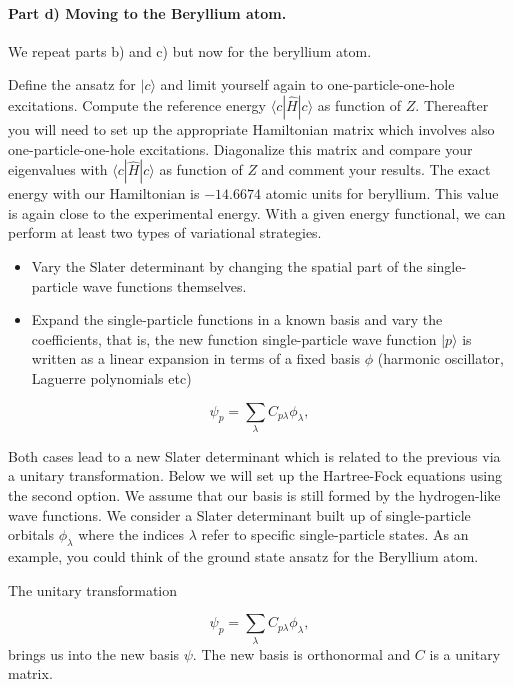 \documentclass[%
oneside,                 %
final,                   %
10pt]{article}
\begin{document}
\paragraph{Part d) Moving to the Beryllium atom.}
We repeat parts b) and c) but now for the beryllium atom.

Define the ansatz for $|c\rangle$ and limit yourself again to one-particle-one-hole excitations.   Compute the reference energy 
$\langle c | \hat{H}| c \rangle $ as function of $Z$. Thereafter you will need to set up the appropriate Hamiltonian matrix
which involves also one-particle-one-hole excitations. Diagonalize this matrix
and compare your eigenvalues with  $\langle c | \hat{H}| c \rangle$ as function of $Z$ and comment your results. 
The exact energy with our Hamiltonian is $-14.6674$ atomic units for beryllium. This value is again close to the experimental energy.
With a given energy functional, we can perform at least two types of variational strategies.

\begin{itemize}
  \item Vary the Slater determinant by changing the spatial part of the single-particle wave functions themselves.

  \item Expand the single-particle functions in a known basis  and vary the coefficients,  that is, the new function single-particle wave function $|p\rangle$ is written as a linear expansion in terms of a fixed basis $\phi$ (harmonic oscillator, Laguerre polynomials etc)  
\end{itemize}

\noindent
\begin{equation*} 
\psi_p  = \sum_{\lambda} C_{p\lambda}\phi_{\lambda},
\end{equation*}

Both cases lead to a new Slater determinant which is related to the previous via  a unitary transformation.
Below we will set up the Hartree-Fock equations using the second option.  
We assume that our basis is still formed by the hydrogen-like wave functions. 
We consider a Slater determinant built up of single-particle orbitals $\phi_{\lambda}$ where the indices $\lambda$ refer to specific single-particle states.  As an example, you could think of the ground state ansatz for the Beryllium atom. 

The unitary transformation

\begin{equation*}
\psi_p  = \sum_{\lambda} C_{p\lambda}\phi_{\lambda},
\end{equation*}
brings us into the new basis $\psi$.  The new basis is orthonormal and $C$ is a unitary matrix.
\end{document}
